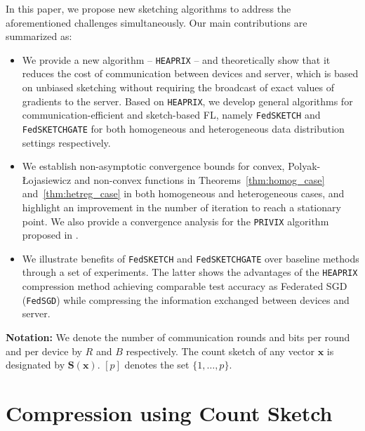 \documentclass[twoside]{article}
\newcommand{\pl}{Polyak-\L{}ojasiewicz}
\begin{document}
 In this paper, we propose new sketching algorithms to address the aforementioned challenges simultaneously.
 Our main contributions are summarized as:
\begin{itemize}
    \item We provide a new algorithm -- \texttt{HEAPRIX} -- and theoretically show that it reduces the cost of communication between devices and server, which is based on unbiased sketching without requiring the broadcast of exact values of gradients to the server. 
    Based on \texttt{HEAPRIX}, we develop general algorithms for communication-efficient and sketch-based FL, namely \texttt{FedSKETCH} and \texttt{FedSKETCHGATE} for both homogeneous and heterogeneous data distribution settings respectively.
    \item We establish non-asymptotic convergence bounds for convex, \pl\: and non-convex functions in Theorems~\ref{thm:homog_case} and~\ref{thm:hetreg_case} in both homogeneous and heterogeneous cases, and highlight an improvement in the number of iteration to reach a stationary point.
We also provide a convergence analysis for the \texttt{PRIVIX} algorithm proposed in \cite{li2019privacy}.
    \item We illustrate benefits of \texttt{FedSKETCH} and \texttt{FedSKETCHGATE} over baseline methods through a set of experiments. 
    The latter shows the advantages of the \texttt{HEAPRIX} compression method achieving comparable test accuracy as Federated SGD (\texttt{FedSGD}) while compressing the information exchanged between devices and server.
\end{itemize}


\noindent\textbf{Notation:} 
We denote the number of communication rounds and bits per round and per device by $R$ and $B$ respectively. 
The count sketch of any vector $\boldsymbol{x}$ is designated by $\mathbf{S}(\boldsymbol{x})$. $[p]$ denotes the set $\{1,\dots,p\}$.

\vspace{-0.05in}
\section{Compression using Count Sketch}\label{sec:compression}
\vspace{-0.05in}
\end{document}
